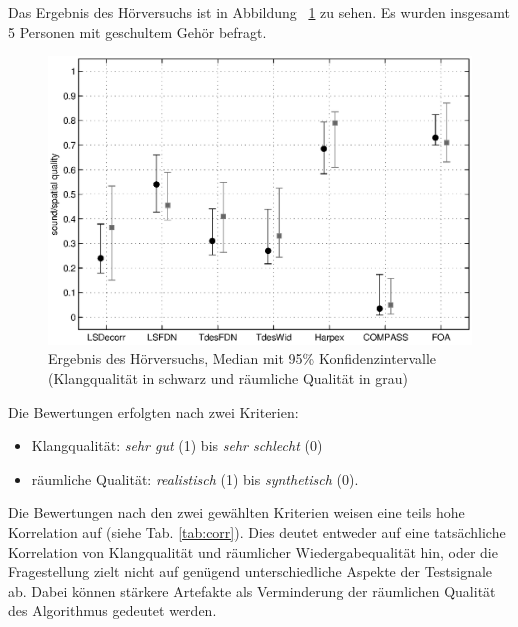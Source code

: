 Das Ergebnis des Hörversuchs ist in Abbildung ~\ref{fig:versuch} zu sehen. Es wurden insgesamt 5 Personen mit geschultem Gehör befragt.

\begin{figure}[!ht]
  \centering
  \includegraphics[width=1\textwidth]{ergebnis/plots/result.eps}
  \caption{Ergebnis des Hörversuchs, Median mit 95\% Konfidenzintervalle (Klangqualität in schwarz und räumliche Qualität in grau)}
  \label{fig:versuch}
\end{figure}

Die Bewertungen erfolgten nach zwei Kriterien:

\begin{itemize}
  \item Klangqualität: \textit{sehr gut} (1) bis \textit{sehr schlecht} (0)
  \item räumliche Qualität: \textit{realistisch} (1) bis \textit{synthetisch} (0).
\end{itemize}

Die Bewertungen nach den zwei gewählten Kriterien weisen eine teils hohe Korrelation auf (siehe Tab. \ref{tab:corr}). Dies deutet entweder auf eine tatsächliche Korrelation von Klangqualität und räumlicher Wiedergabequalität hin, oder die Fragestellung zielt nicht auf genügend unterschiedliche Aspekte der Testsignale ab. Dabei können stärkere Artefakte als Verminderung der räumlichen Qualität des Algorithmus gedeutet werden.

\begin{table}
\caption{Korrelationskoeffizient der zwei bewerteten Kriterien}
\label{tab:corr}
\end{table}
